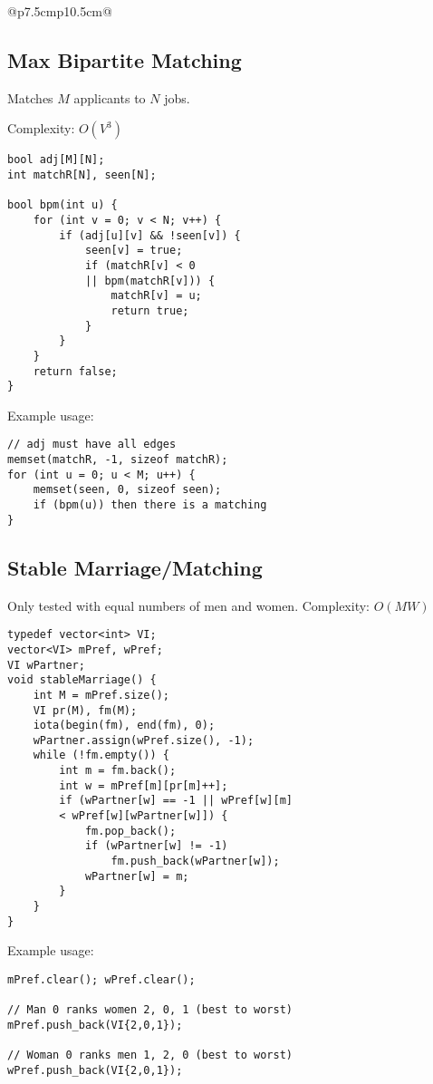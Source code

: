 \documentclass[letterpaper]{article}
\begin{document}
\clearpage

\vspace*{-3em}
\begin{tabular}{@{}p{7.5cm}p{10.5cm}@{}}
\subsection{Max Bipartite Matching}

Matches $M$ applicants to $N$ jobs.

Complexity: $O\left(V^3\right)$
\begin{lstlisting}
bool adj[M][N];
int matchR[N], seen[N];

bool bpm(int u) {
	for (int v = 0; v < N; v++) {
		if (adj[u][v] && !seen[v]) {
			seen[v] = true;
			if (matchR[v] < 0
			|| bpm(matchR[v])) {
				matchR[v] = u;
				return true;
			}
		}
	}
	return false;
}
\end{lstlisting}

Example usage:
\begin{lstlisting}
// adj must have all edges
memset(matchR, -1, sizeof matchR);
for (int u = 0; u < M; u++) {
	memset(seen, 0, sizeof seen);
	if (bpm(u)) then there is a matching
}
\end{lstlisting}

\subsection{Stable Marriage/Matching}

Only tested with equal numbers of men and women. Complexity: $O\left(MW\right)$

\begin{lstlisting}
typedef vector<int> VI;
vector<VI> mPref, wPref;
VI wPartner;
void stableMarriage() {
	int M = mPref.size();
	VI pr(M), fm(M);
	iota(begin(fm), end(fm), 0);
	wPartner.assign(wPref.size(), -1);
	while (!fm.empty()) {
		int m = fm.back();
		int w = mPref[m][pr[m]++];
		if (wPartner[w] == -1 || wPref[w][m]
		< wPref[w][wPartner[w]]) {
			fm.pop_back();
			if (wPartner[w] != -1)
				fm.push_back(wPartner[w]);
			wPartner[w] = m;
		}
	}
}
\end{lstlisting}

Example usage:
\begin{lstlisting}
mPref.clear(); wPref.clear();

// Man 0 ranks women 2, 0, 1 (best to worst)
mPref.push_back(VI{2,0,1});

// Woman 0 ranks men 1, 2, 0 (best to worst)
wPref.push_back(VI{2,0,1});


\end{lstlisting}
\end{tabular}
\end{document}
